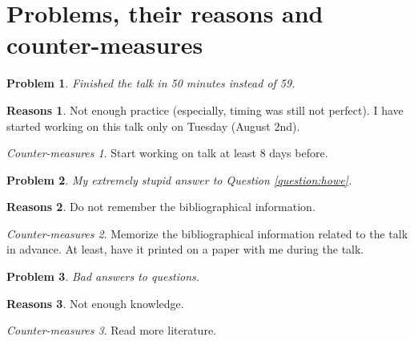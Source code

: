 \documentclass[12pt]{article} %
\theoremstyle{theorem}
\newtheorem{problem}{Problem}
\theoremstyle{definition}
\newtheorem{reason}{Reasons}
\theoremstyle{remark}
\newtheorem{countermeasure}{Counter-measures}
\begin{document}
\section{Problems, their reasons and counter-measures}
\begin{problem}
	Finished the talk in 50 minutes instead of 59.
\end{problem}
\begin{reason}
	Not enough practice (especially, timing was still not perfect).
	I have started working on this talk only on Tuesday (August 2nd).
\end{reason}
\begin{countermeasure}
	Start working on talk at least 8 days before.
\end{countermeasure}

\begin{problem}
	My extremely stupid answer to Question \ref{question:howe}.
\end{problem}
\begin{reason}
	Do not remember the bibliographical information.
\end{reason}
\begin{countermeasure}
	Memorize the bibliographical information related to the talk in advance.
	At least, have it printed on a paper with me during the talk.
\end{countermeasure}

\begin{problem}
	Bad answers to questions.
\end{problem}
\begin{reason}
	Not enough knowledge.
\end{reason}
\begin{countermeasure}
	Read more literature.
\end{countermeasure}

\end{document}
